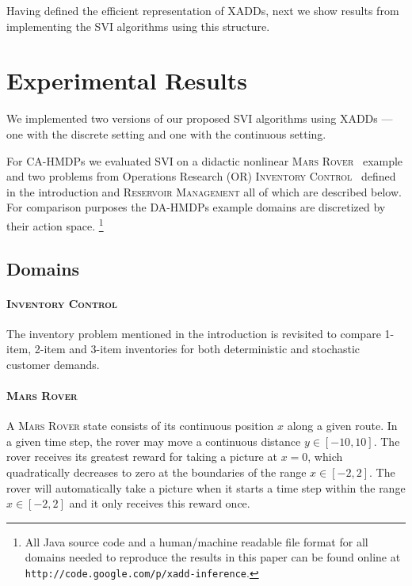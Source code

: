 \documentclass[twoside,11pt]{article}
\newcommand{\MarsRover}{\textsc{Mars Rover }}
\newcommand{\InventoryControl}{\textsc{Inventory Control }}
\newcommand{\WaterReservoir}{\textsc{Reservoir Management }}
\begin{document}
Having defined the efficient representation of XADDs, next we show results from implementing the SVI algorithms using this structure.

\section{Experimental Results} \label{results}

We implemented two versions of our proposed SVI algorithms using XADDs
--- one with the discrete setting and one with the continuous setting. 

For CA-HMDPs we evaluated SVI on a didactic nonlinear
\MarsRover\ example and two problems from Operations Research (OR) \InventoryControl\ defined in the introduction and \WaterReservoir  all of which are described below. For comparison purposes the DA-HMDPs example domains are discretized by their action space. \footnote{All Java source code and a human/machine readable file format for all domains needed to reproduce
the results in this paper can be found online at
\texttt{http://code.google.com/p/xadd-inference}.}

\subsection{Domains}

\paragraph{\InventoryControl}
The inventory problem mentioned in the introduction is revisited to compare 1-item, 2-item and 3-item inventories for both deterministic and stochastic customer demands. 
\paragraph{\MarsRover}
A \MarsRover state consists of its continuous position $x$ along a given route.  In a given time step, the rover may move a continuous distance $y \in [-10,10]$.  The rover receives its greatest reward for taking a picture at $x=0$, which quadratically decreases to zero at the boundaries of the range $x \in [-2,2]$.  The rover will
automatically take a picture when it starts a time step within the range $x \in [-2,2]$ and it only receives this reward once.
\end{document}
